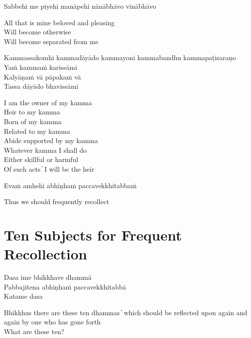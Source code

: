 Sabbehi me piyehi manāpehi nānābhāvo vinābhāvo

\begin{english}
  All that is mine beloved and pleasing\\
  Will become otherwise\\
  Will become separated from me
\end{english}

Kammassakomhi kammadāyādo kammayoni kammabandhu kammapaṭisaraṇo\\
Yaṁ kammaṁ karissāmi\\
Kalyāṇaṁ vā pāpakaṁ vā\\
Tassa dāyādo bhavissāmi

\begin{english}
  I am the owner of my kamma\\
  Heir to my kamma\\
  Born of my kamma\\
  Related to my kamma\\
  Abide supported by my kamma\\
  Whatever kamma I shall do\\
  Either skillful or harmful\\
  Of such acts  ̓  I will be the heir
\end{english}

Evaṁ amhehi abhiṇhaṁ paccavekkhitabbaṁ

\begin{english}
  Thus we should frequently recollect
\end{english}

\suttaRef{[AN 5.57]}

\clearpage

\section{Ten Subjects for Frequent Recollection}

\begin{leader}
\end{leader}

Dasa ime bhikkhave dhammā\\
Pabbajitena abhiṇhaṁ paccavekkhitabbā\\
Katame dasa

\begin{english}
  Bhikkhus there are these ten dhammas  ̓  which should be reflected upon again and again by one who has gone forth\\
  What are these ten?
\end{english}

